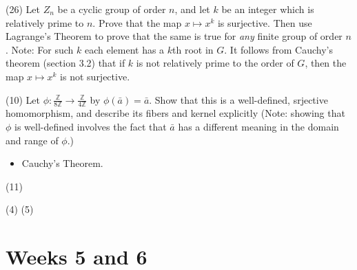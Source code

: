 \documentclass[1    0pt, answers]{exam} \renewcommand{\baselinestretch}{1.05}
\theoremstyle{plain}
\theoremstyle{definition}
\begin{document}
\begin{questions}
\begin{solution}
\end{solution}

\question (26) Let $Z_n$ be a cyclic group of order $n$, and let $k$ be an integer which is relatively prime to $n$. Prove that the map $x \mapsto x^k$ is surjective. Then use Lagrange's Theorem to prove that the same is true for \emph{any} finite group of order $n$. Note: For such $k$ each element has a $k$th root in $G$. It follows from Cauchy's theorem (section 3.2) that if $k$ is not relatively prime to the order of $G$, then the map $x \mapsto x^k$ is not surjective.


\question (10) Let $\phi : \frac{\mathbb{Z}}{8 \mathbb{Z}} \to \frac{\mathbb{Z}}{4 \mathbb{Z}}$ by $\phi(\bar{a}) = \bar{a}$. Show that this is a well-defined, srjective homomorphism, and describe its fibers and kernel explicitly (Note: showing that $\phi$ is well-defined involves the fact that $\bar{a}$ has a different meaning in the domain and range of $\phi$.)

\begin{itemize}
\item Cauchy's Theorem.
\end{itemize}

\question (11)

\question (4)
\question (5)


\end{questions}

\section{Weeks 5 and 6}
\end{document}
